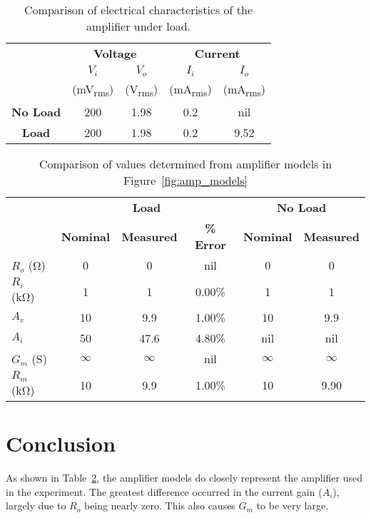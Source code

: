 \documentclass{article}
\begin{document}
\begin{table}[hbtp]
  \centering
  \begin{tabular}{*{5}{c}}
    & \multicolumn{2}{c}{\textbf{Voltage}} & \multicolumn{2}{c}{\textbf{Current}} \\
    & $V_i$ & $V_o$ & $I_i$ & $I_o$ \\
    & (\si{\milli\volt_{rms}}) & (\si{\volt_{rms}}) & (\si{\milli\ampere_{rms}}) & (\si{\milli\ampere_{rms}}) \\
    \hline
    \textbf{No Load} & 200 & 1.98 & 0.2 & nil \\
    \textbf{Load} & 200 & 1.98 & 0.2 & 9.52 \\
  \end{tabular}
  \caption{Comparison of electrical characteristics of the amplifier under load.}
  \label{tab:table_02}
\end{table}

\begin{table}[hbtp]
  \centering
  \begin{tabular}{l*{5}{c}}
    & \multicolumn{3}{c}{\textbf{Load}} & \multicolumn{2}{c}{\textbf{No Load}} \\
    & \textbf{Nominal} & \textbf{Measured} & \textbf{\% Error} & \textbf{Nominal} & \textbf{Measured} \\
    \hline
    $R_o$ (\si{\ohm}) & 0 & 0 & nil & 0 & 0 \\
    $R_i$ (\si{\kilo\ohm}) & 1 & 1 & 0.00\% & 1 & 1 \\
    $A_v$ & 10 & 9.9 & 1.00\% & 10 & 9.9 \\
    $A_i$ & 50 & 47.6 & 4.80\% & nil & nil \\
    $G_m$ (\si{\siemens}) & $\infty$ & $\infty$ & nil & $\infty$ & $\infty$ \\
    $R_m$ (\si{\kilo\ohm}) & 10 & 9.9 & 1.00\% & 10 & 9.90 \\
  \end{tabular}
  \caption{Comparison of values determined from amplifier models in Figure~\ref{fig:amp_models}}
  \label{tab:table_03}
\end{table}

\section{Conclusion}
\label{sec:conclusion}

As shown in Table~\ref{tab:table_03}, the amplifier models do closely
represent the amplifier used in the experiment.  The greatest
difference occurred in the current gain ($A_i$), largely due to $R_o$
being nearly zero.  This also causes $G_m$ to be very large.
\end{document}
